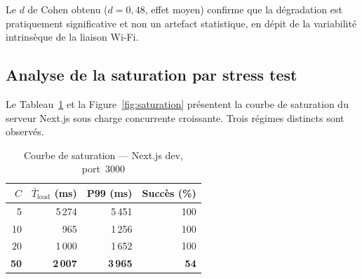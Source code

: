\documentclass[10pt,conference,compsoc]{IEEEtran}
\begin{document}
Le $d$ de Cohen obtenu ($d = 0{,}48$, effet moyen) confirme que la
dégradation est pratiquement significative et non un artefact
statistique, en dépit de la variabilité intrinsèque de la liaison Wi-Fi.

\subsection{Analyse de la saturation par stress test}

Le Tableau~\ref{tab:stress} et la Figure~\ref{fig:saturation} présentent
la courbe de saturation du serveur Next.js sous charge concurrente
croissante. Trois régimes distincts sont observés.

\begin{table}[htbp]
\centering
\caption{Courbe de saturation — Next.js dev, port~3000}
\label{tab:stress}
\begin{tabular}{rrrr}
\toprule
$C$ & $\bar{T}_\mathrm{load}$ (ms) & P99 (ms) & Succès (\%) \\
\midrule
5          & 5\,274        & 5\,451        & 100 \\
10         & 965           & 1\,256        & 100 \\
20         & 1\,000        & 1\,652        & 100 \\
\textbf{50}& \textbf{2\,007}& \textbf{3\,965}& \textbf{54} \\
\bottomrule
\end{tabular}
\end{table}
\end{document}
